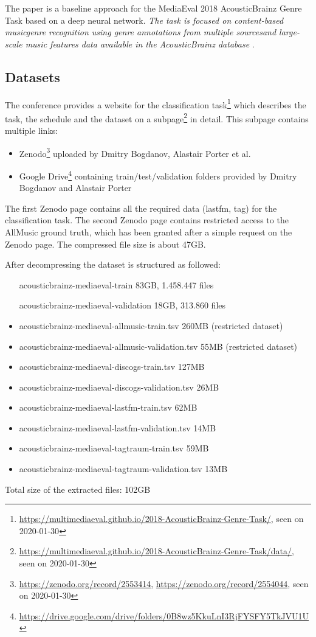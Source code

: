 \documentclass[sigconf,nonacm]{acmart}
\begin{document}
The paper is a baseline approach for the MediaEval 2018 AcousticBrainz Genre Task based on a deep neural network.
\textit{The task is focused on content-based musicgenre recognition using genre annotations from multiple sourcesand large-scale music features data available in the AcousticBrainz database} \cite{MediaEval1}.

\subsection{Datasets}

The conference provides a website for the classification task\footnote{\url{https://multimediaeval.github.io/2018-AcousticBrainz-Genre-Task/}, seen on 2020-01-30} which describes the task, the schedule and the dataset on a subpage\footnote{\url{https://multimediaeval.github.io/2018-AcousticBrainz-Genre-Task/data/}, seen on 2020-01-30} in detail.
This subpage contains multiple links:
\begin{itemize}
    \item Zenodo\footnote{\url{https://zenodo.org/record/2553414}, \url{https://zenodo.org/record/2554044}, seen on 2020-01-30} uploaded by Dmitry Bogdanov, Alastair Porter et al.
    \item Google Drive\footnote{\url{https://drive.google.com/drive/folders/0B8wz5KkuLnI3RjFYSFY5TkJVU1U}} containing train/test/validation folders provided by Dmitry Bogdanov and Alastair Porter    
\end{itemize}


The first Zenodo page contains all the required data (lastfm, tag) for the classification task. The second Zenodo page contains restricted access to the AllMusic ground truth, which has been granted after a simple request on the Zenodo page.
The compressed file size is about 47GB.

After decompressing the dataset is structured as followed:
\begin{itemize}
    \item [acousticbrainz-mediaeval-train] 83GB, 1.458.447 files
    \item [acousticbrainz-mediaeval-validation] 18GB, 313.860 files
    \item acousticbrainz-mediaeval-allmusic-train.tsv 260MB (restricted dataset)
    \item acousticbrainz-mediaeval-allmusic-validation.tsv 55MB (restricted dataset)
    \item acousticbrainz-mediaeval-discogs-train.tsv 127MB
    \item acousticbrainz-mediaeval-discogs-validation.tsv 26MB
    \item acousticbrainz-mediaeval-lastfm-train.tsv 62MB
    \item acousticbrainz-mediaeval-lastfm-validation.tsv 14MB
    \item acousticbrainz-mediaeval-tagtraum-train.tsv 59MB
    \item acousticbrainz-mediaeval-tagtraum-validation.tsv 13MB
\end{itemize}
Total size of the extracted files: 102GB
\end{document}
